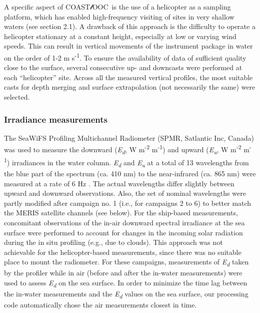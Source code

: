 \documentclass[essd, manuscript]{copernicus}
\newcommand{\coastlooc}{COAST$\mathscr{l}$OOC~\allowbreak}
\begin{document}
A specific aspect of \coastlooc is the use of a helicopter as a sampling platform, which has enabled high-frequency visiting of sites in very shallow waters (see section 2.1). A drawback of this approach is the difficulty to operate a helicopter stationary at a constant height, especially at low or varying wind speeds. This can result in vertical movements of the instrument package in water on the order of 1-2 m s\textsuperscript{-1}. To ensure the availability of data of sufficient quality close to the surface, several consecutive up- and downcasts were performed at each “helicopter” site. Across all the measured vertical profiles, the most suitable casts for depth merging and surface extrapolation (not necessarily the same) were selected. 

\subsubsection{Irradiance measurements}

The SeaWiFS Profiling Multichannel Radiometer (SPMR, Satlantic Inc, Canada) was used to measure the downward (\textit{E\textsubscript{d}}, W m\textsuperscript{-2} \textmu m\textsuperscript{-1}) and upward (\textit{E\textsubscript{u}}, W m\textsuperscript{-2} \textmu m\textsuperscript{-1}) irradiances in the water column. \textit{E\textsubscript{d}} and \textit{E\textsubscript{u}} at a total of 13 wavelengths from the blue part of the spectrum (ca. 410 nm) to the near-infrared (ca. 865 nm) were measured at a rate of 6 Hz . The actual wavelengths differ slightly between upward and downward observations. Also, the set of nominal wavelengths were partly modified after campaign no. 1 (i.e., for campaigns 2 to 6) to better match the MERIS satellite channels (see below). For the ship-based measurements, concomitant observations of the in-air downward spectral irradiance at the sea surface were performed to account for changes in the incoming solar radiation during the in situ profiling (e.g., due to clouds). This approach was not achievable for the helicopter-based measurements, since there was no suitable place to mount the radiometer. For these campaigns, measurements of \textit{E\textsubscript{d}} taken by the profiler while in air (before and after the in-water measurements) were used to assess \textit{E\textsubscript{d}} on the sea surface. In order to minimize the time lag between the in-water measurements and the \textit{E\textsubscript{d}} values on the sea surface, our processing code automatically chose the air measurements closest in time.
\end{document}
